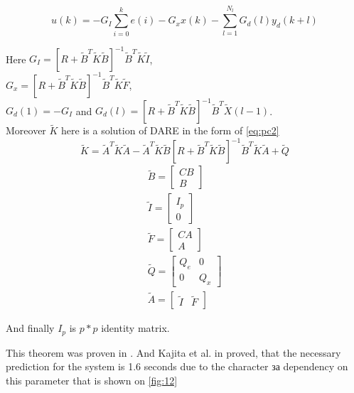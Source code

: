 \documentclass[12pt,a4paper]{report}
\begin{document}
			\begin{equation}\label{eq:pc1}
				u(k) = -G_I \sum^{k}_{i=0} e(i) - G_xx(k) - \sum^{N_l}_{l=1}G_d(l)y_d(k+l)
			\end{equation}
		
			Here $G_I = [R+\tilde{B}^T \tilde{K} \tilde{B}]^{-1} \tilde{B}^T \tilde{K} \tilde{I}$, \\$G_x = [R+\tilde{B}^T \tilde{K} \tilde{B}]^{-1} \tilde{B}^T \tilde{K} \tilde{F}$,\\
			$G_d(1) = -G_I$ and $G_d(l) = [R+\tilde{B}^T \tilde{K} \tilde{B}]^{-1} \tilde{B}^T \tilde{X}(l-1)$.\\
			Moreover $\tilde{K}$ here is a solution of DARE in the form of \ref{eq:pc2}
			\begin{equation}\label{eq:pc2}
				\tilde{K} = \tilde{A}^T\tilde{K}\tilde{A} - \tilde{A}^T \tilde{K} \tilde{B} [R + \tilde{B}^T \tilde{K} \tilde{B}]^{-1} \tilde{B}^T\tilde{K}\tilde{A} + \tilde{Q}
			\end{equation}
			\begin{equation}\label{eq:pc3}
				\begin{split}
					\tilde{B} = \begin{bmatrix} C B \\ B \end{bmatrix}\\
					\tilde{I} = \begin{bmatrix} I_p \\ 0 \end{bmatrix}\\
					\tilde{F} = \begin{bmatrix} CA \\ A \end{bmatrix}\\
					\tilde{Q} = \begin{bmatrix} Q_e & 0 \\ 0 & Q_x \end{bmatrix}\\
					\tilde{A} = \begin{bmatrix} \tilde{I} & \tilde{F} \end{bmatrix}
				\end{split}
			\end{equation}
			
			And finally $I_p$ is $p * p$ identity matrix.
			
			This theorem was proven in \cite{katayama1985design}. And Kajita et al. in \cite{kajita2003biped} proved, that the necessary prediction for the system is 1.6 seconds due to the character за dependency on this parameter that is shown on \cref{fig:12} 
			
\end{document}
